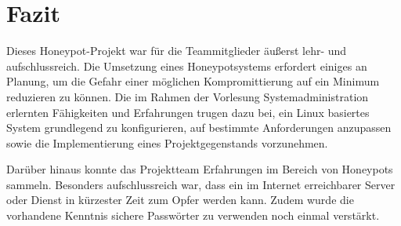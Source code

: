 \chapter{Fazit}
\label{ch:Fazit}






Dieses Honeypot-Projekt war für die Teammitglieder äußerst lehr- und aufschlussreich. Die Umsetzung eines Honeypotsystems erfordert einiges an Planung, um die Gefahr einer möglichen Kompromittierung auf ein Minimum reduzieren zu können. Die im Rahmen der Vorlesung Systemadministration erlernten Fähigkeiten und Erfahrungen trugen dazu bei, ein Linux basiertes System grundlegend zu konfigurieren, auf bestimmte Anforderungen anzupassen sowie die Implementierung eines Projektgegenstands vorzunehmen.

Darüber hinaus konnte das Projektteam Erfahrungen im Bereich von Honeypots sammeln. Besonders aufschlussreich war, dass ein im Internet erreichbarer Server oder Dienst in kürzester Zeit zum Opfer werden kann. Zudem wurde die vorhandene Kenntnis sichere Passwörter zu verwenden noch einmal verstärkt.
